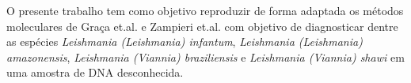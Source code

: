 O presente trabalho tem como objetivo reproduzir de forma adaptada os métodos
moleculares de Graça et.al.\cite{RFLPgraca2012} e Zampieri
et.al.\cite{HRMzampi2016} com objetivo de diagnosticar dentre as espécies
\textit{Leishmania (Leishmania) infantum}, \textit{Leishmania (Leishmania)
amazonensis}, \textit{Leishmania (Viannia) braziliensis} e \textit{Leishmania
(Viannia) shawi} em uma amostra de DNA desconhecida. 
